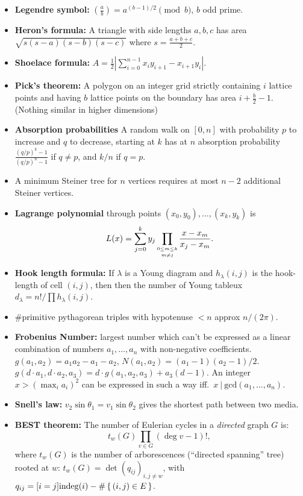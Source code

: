 \documentclass[9pt,a4paper,landscape,oneside]{amsart}
\newenvironment{myitemize}
{\begin{itemize}[leftmargin=.3cm]
	\setlength{\itemsep}{0pt}
	\setlength{\parskip}{0pt}
	\setlength{\parsep}{0pt}     }
{ \end{itemize}                  }
\begin{document}
\begin{multicols*}{3}
\begin{myitemize}
	\item \textbf{Legendre symbol:} $\left(\frac{a}{b}\right) = a^{(b-1)/2} \pmod{b}$, $b$ odd prime.
	\item \textbf{Heron's formula:} A triangle with side lengths
		$a,b,c$ has area $\sqrt{s(s-a)(s-b)(s-c)}$ where $s =
		\frac{a+b+c}{2}$.
	\item \textbf{Shoelace formula:} $A = \frac12 |\sum_{i=0}^{n-1} x_iy_{i+1} - x_{i+1}y_i|$.
	\item \textbf{Pick's theorem:} A polygon on an integer grid
		strictly containing $i$ lattice points and having $b$ lattice
		points on the boundary has area $i + \frac{b}{2} - 1$. (Nothing
		similar in higher dimensions)
	\item \textbf{Absorption probabilities} A random walk on $[0,n]$ with probability $p$ to increase and $q$ to decrease, starting at $k$ has at $n$ absorption probability $\frac{(q/p)^k-1}{(q/p)^n-1}$ if $q \not= p$, and $k/n$ if $q = p$.
	\item A minimum Steiner tree for $n$ vertices requires at most $n-2$ additional Steiner vertices.
	\item \textbf{Lagrange polynomial} through points $(x_0,y_0),\ldots,(x_k,y_k)$ is
	\[
		L(x) = \sum_{j=0}^k y_j \prod_{\shortstack{$\scriptscriptstyle 0\leq m \leq k$ \\ $\scriptscriptstyle m\neq j$}} \frac{x-x_m}{x_j - x_m}.
	\]
	\item \textbf{Hook length formula:} If $\lambda$ is a Young diagram and $h_{\lambda}(i,j)$ is the hook-length of cell $(i,j)$, then then the number of Young tableux $d_{\lambda} = n!/\prod h_{\lambda}(i,j)$.
	\item \#primitive pythagorean triples with hypotenuse $<n$ approx $n/(2\pi)$.
	\item \textbf{Frobenius Number:} largest number which can't be
		expressed as a linear combination of numbers $a_1,\ldots,a_n$
		with non-negative coefficients. $g(a_1,a_2) = a_1a_2-a_1-a_2$,
		$N(a_1,a_2)=(a_1-1)(a_2-1)/2$. $g(d\cdot a_1,d\cdot a_2,a_3) =
		d\cdot g(a_1,a_2,a_3) + a_3(d-1)$. An integer $x>\left(\max_i
		a_i\right)^2$ can be expressed in such a way iff.\ $x\ |\
		\mathrm{gcd}(a_1,\ldots,a_n)$.
	\item \textbf{Snell's law:} $v_2 \sin\theta_1 = v_1 \sin\theta_2$ gives the shortest path between two media.
	\item \textbf{BEST theorem:}
		The number of Eulerian cycles in a \emph{directed} graph $G$ is:
		\begin{equation*}
			t_w(G) \prod_{v \in G} (\deg v - 1)!,
		\end{equation*}
		where $t_w(G)$ is the number of arborescences (``directed spanning'' tree) rooted at $w$: $t_w(G) = \det\left( q_{ij} \right)_{i,j \neq w}$, with $q_{ij} = [i=j] \mathrm{indeg}(i) - \# \set{(i,j) \in E}$.


\end{myitemize}
\end{multicols*}
\end{document}
